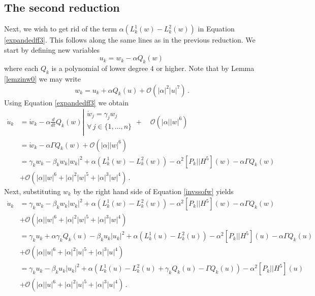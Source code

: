 \documentclass[12pt]{article}
\renewcommand{\mathcal}{\mathscr}
\theoremstyle{plain}
\theoremstyle{definition}
\theoremstyle{remark}
\theoremstyle{remark}
\begin{document}
\subsection{The second reduction}\label{thesecondreduction}
Next, we wish to get rid of the term $\alpha(L^1_k(w) - L^2_k(w))$ in Equation \eqref{expandedff3}. This follows along the same lines as in the previous reduction. We start by defining new variables
\begin{equation}
    u_k = w_k - \alpha Q_k(w)\,
\end{equation}
where each $Q_k$ is a polynomial of lower degree $4$ or higher. Note that by Lemma \ref{lemzinw0} we may write
\begin{equation}\label{invssofw}
    w_k = u_k + \alpha Q_k(u) + \mathcal{O}(|\alpha|^2|u|^7)\, .
\end{equation}
Using Equation \eqref{expandedff3} we obtain
\begin{align}
    \dot{u}_k &= \dot{w}_k - \alpha \frac{d}{dt}Q_k(w)\left|{\begin{array}{l}
  \dot{w}_j =  \gamma_jw_j\\
   \forall \, j \in 
   \{1, \dots, n\} \\
\end{array}}\right. + \quad \mathcal{O}(|\alpha||w|^6) \\ \nonumber
&= \dot{w}_k - \alpha\Gamma Q_k(w) + \mathcal{O}(|\alpha||w|^6) \\ \nonumber
&= \gamma_kw_k - \beta_k w_k|w_k|^2 +\alpha(L^1_k(w) - L^2_k(w))  - \alpha^2[P_k|| {H}^5](w) - \alpha\Gamma Q_k(w) \\ \nonumber
&+ \mathcal{O}(|\alpha||w|^6 + |\alpha|^2|w|^5 + |\alpha|^3|w|^4) \, .
\end{align}
Next, substituting $w_k$ by the right hand side of Equation \eqref{invssofw} yields
\begin{align}\label{equationalmostthere345}
 \dot{u}_k &= \gamma_kw_k - \beta_k w_k|w_k|^2 +\alpha(L^1_k(w) - L^2_k(w))  - \alpha^2[P_k|| {H}^5](w) - \alpha\Gamma Q_k(w) \\ \nonumber
&+ \mathcal{O}(|\alpha||w|^6 + |\alpha|^2|w|^5 + |\alpha|^3|w|^4) \\ \nonumber
&= \gamma_ku_k + \alpha\gamma_kQ_k(u)- \beta_k u_k|u_k|^2 +\alpha(L^1_k(u) - L^2_k(u))  - \alpha^2[P_k|| {H}^5](u) - \alpha\Gamma Q_k(u) \\ \nonumber
&+ \mathcal{O}(|\alpha||u|^6 + |\alpha|^2|u|^5 + |\alpha|^3|u|^4) \\ \nonumber
&= \gamma_ku_k - \beta_k u_k|u_k|^2 +\alpha(L^1_k(u) - L^2_k(u)+ \gamma_kQ_k(u) - \Gamma Q_k(u) )  - \alpha^2[P_k|| {H}^5](u) \\ \nonumber
&+ \mathcal{O}(|\alpha||u|^6 + |\alpha|^2|u|^5 + |\alpha|^3|u|^4)  \, .
\end{align}
\end{document}
